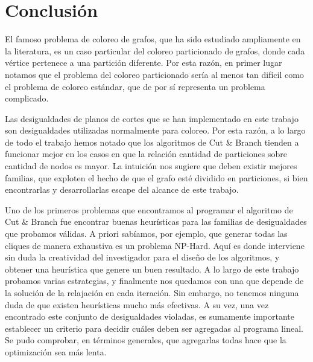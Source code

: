 \section{Conclusión}

El famoso problema de coloreo de grafos, que ha sido estudiado ampliamente en la literatura, es un caso particular del coloreo particionado de grafos, donde cada vértice pertenece a una partición diferente. Por esta razón, en primer lugar notamos que el problema del coloreo particionado sería al menos tan difícil como el problema de coloreo estándar, que de por sí representa un problema complicado.

Las desigualdades de planos de cortes que se han implementado en este trabajo son desigualdades utilizadas normalmente para coloreo. Por esta razón, a lo largo de todo el trabajo hemos notado que los algoritmos de Cut \& Branch tienden a funcionar mejor en los casos en que la relación cantidad de particiones sobre cantidad de nodos es mayor. La intuición nos sugiere que deben existir mejores familias, que exploten el hecho de que el grafo esté dividido en particiones, si bien encontrarlas y desarrollarlas escape del alcance de este trabajo.

Uno de los primeros problemas que encontramos al programar el algoritmo de Cut \& Branch fue encontrar buenas heurísticas para las familias de desigualdades que probamos válidas. A priori sabíamos, por ejemplo, que generar todas las cliques de manera exhaustiva es un problema NP-Hard. Aquí es donde interviene sin duda la creatividad del investigador para el diseño de los algoritmos, y obtener una heurística que genere un buen resultado. A lo largo de este trabajo probamos varias estrategias, y finalmente nos quedamos con una que depende de la solución de la relajación en cada iteración. Sin embargo, no tenemos ninguna duda de que existen heurísticas mucho más efectivas. A su vez, una vez encontrado este conjunto de desigualdades violadas, es sumamente importante establecer un criterio para decidir cuáles deben ser agregadas al programa lineal. Se pudo comprobar, en términos generales, que agregarlas todas hace que la optimización sea más lenta.


